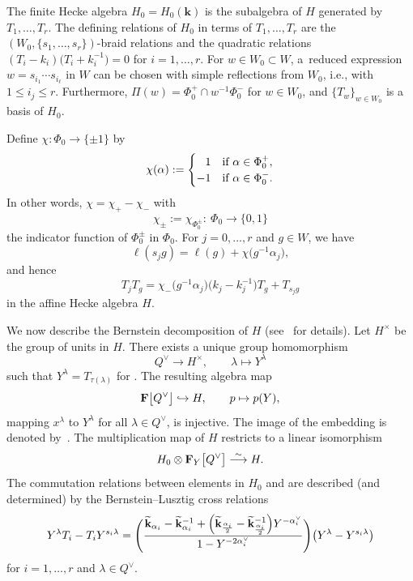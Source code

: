 \documentclass[pdftex]{sigma}
\numberwithin{equation}{section}
\begin{document}
The finite Hecke algebra $H_0=H_0(\mathbf{k})$ is the subalgebra of $H$ generated by $T_1,\dots,T_r$. The defining relations of $H_0$ in terms of $T_1,\dots,T_r$
are the $(W_0,\{s_1,\dots,s_r\})$-braid relations and the quadratic relations $(T_i-k_i)\bigl(T_i+k_i^{-1}\bigr)=0$ for $i=1,\dots,r$.
For $w\in W_0\subset W$, a~reduced expression $w=s_{i_1}\cdots s_{i_\ell}$ in $W$ can be chosen with simple reflections from $W_0$, i.e., with $1\leq i_j\leq r$. Furthermore,
$\Pi(w)=\Phi_0^+\cap w^{-1}\Phi_0^-$ for $w\in W_0$, and $\{T_w\}_{w\in W_0}$ is a basis of $H_0$.

Define $\chi\colon \Phi_0\rightarrow \{\pm 1\}$ by
\begin{equation}\label{chi}
\chi(\alpha):=
\begin{cases}
\hphantom{-}1&\text{if}\ \alpha\in\Phi_0^{+},\\
-1&\text{if}\ \alpha\in\Phi_0^-.
\end{cases}
\end{equation}
In other words, $\chi=\chi_+-\chi_-$ with
\begin{equation*}%
\chi_{\pm}:=\chi_{\Phi_0^{\pm}}\colon\ \Phi_0\rightarrow \{0,1\}
\end{equation*}
the indicator function of $\Phi_0^{\pm}$ in $\Phi_0$.
For $j=0,\dots,r$ and $g\in W$, we have
\begin{equation*}%
\ell(s_jg)=\ell(g)+\chi\bigl(g^{-1}\alpha_j\bigr),
\end{equation*}
and hence
\begin{equation}\label{TjTw}
T_jT_g=\chi_-\bigl(g^{-1}\alpha_j\bigr)\bigl(k_j-k_j^{-1}\bigr)T_g+T_{s_jg}
\end{equation}
in the affine Hecke algebra $H$.

We now describe the Bernstein decomposition of $H$ (see~\cite{Lu} for details).
Let $H^\times$ be the group of units in $H$. There exists a unique group homomorphism
\[
Q^\vee\rightarrow H^\times,\qquad \lambda\mapsto Y^\lambda
\]
such that $Y^\lambda=T_{\tau(\lambda)}$ for .
The resulting algebra map
\begin{equation}\label{injY}
\mathbf{F}\smash{\bigl[Q^\vee\bigr]}\hookrightarrow H,\qquad p\mapsto p(Y),
\end{equation}
mapping $x^\lambda$ to $Y^\lambda$ for all $\lambda\in Q^\vee$, is injective. The image of the embedding is denoted by~.
The multiplication map of $H$ restricts to a linear isomorphism
\[
H_0\otimes\mathbf{F}_Y\smash{\bigl[Q^\vee\bigr]}\overset{\sim}{\longrightarrow} H.
\]
The commutation relations between elements in $H_0$ and  are described (and determined) by the {Bernstein--Lusztig} cross relations
\begin{equation}\label{crossY}
Y^\lambda T_i-T_i Y^{s_i\lambda}=\Biggl(\frac{\widetilde{\mathbf{k}}_{\alpha_i}-\widetilde{\mathbf{k}}_{\alpha_i}^{-1}+
\Bigl(\widetilde{\mathbf{k}}_{\frac{\alpha_i}{2}}-\widetilde{\mathbf{k}}_{\frac{\alpha_i}{2}}^{-1}\Bigr)Y^{-\alpha_i^\vee}}{1-Y^{-2\alpha_i^\vee}}\Biggr)\bigl(Y^\lambda-Y^{s_i\lambda}\bigr)
\end{equation}
for $i=1,\dots,r$ and $\lambda\in Q^\vee$.
\end{document}
